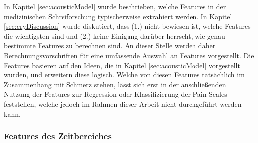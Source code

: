 In Kapitel \ref{sec:acousticModel} wurde beschrieben, welche Features in der medizinischen Schreiforschung typischerweise extrahiert werden. In Kapitel \ref{sec:cryDiscussion} wurde diskutiert, dass (1.) nicht bewiesen ist, welche Features die \glqq wichtigsten\grqq{} sind und (2.) keine Einigung darüber herrscht, wie genau bestimmte Features zu berechnen sind. An dieser Stelle werden daher Berechnungsvorschriften für eine umfassende Auswahl an Features vorgestellt. Die Features basieren auf den Ideen, die in Kapitel \ref{sec:acousticModel} vorgestellt wurden, und erweitern diese logisch. Welche von diesen Features tatsächlich im Zusammenhang mit Schmerz stehen, lässt sich erst in der anschließenden Nutzung der Features zur Regression oder Klassifizierung der Pain-Scales feststellen, welche jedoch im Rahmen dieser Arbeit nicht durchgeführt werden kann.


\subsubsection{Features des Zeitbereiches}


